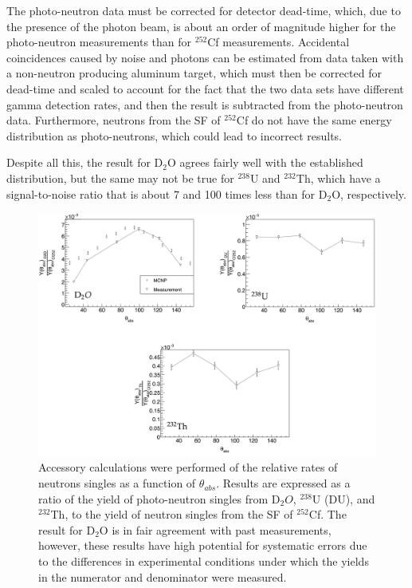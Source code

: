 The photo-neutron data must be corrected for detector dead-time, which, due to the presence of the photon beam, is about an order of magnitude higher for the photo-neutron measurements than for $^{252}$Cf measurements.
Accidental coincidences caused by noise and photons can be estimated from data taken with a non-neutron producing aluminum target, which must then be corrected for dead-time and scaled to account for the fact that the two data sets have different gamma detection rates, and then the result is subtracted from the photo-neutron data.
Furthermore, neutrons from the SF of $^{252}$Cf do not have the same energy distribution as photo-neutrons, which could lead to incorrect results.

Despite all this, the result for D$_{2}$O agrees fairly well with the established distribution, but the same may not be true for $^{238}$U and $^{232}$Th, which have a signal-to-noise ratio that is about 7 and 100 times less than for D$_{2}$O, respectively.

\begin{figure}
    \includegraphics[width = 1\textwidth]{Content/Results/Singles.png}
    \caption{Accessory calculations were performed of the relative rates of neutrons singles as a function of $\theta_{abs}$. 
    Results are expressed as a ratio of the yield of photo-neutron singles from D$_{2}O$, $^{238}$U (DU), and $^{232}$Th, to the yield of neutron singles from the SF of $^{252}$Cf.
   The result for D$_{2}$O is in fair agreement with past measurements, however, these results have high potential for systematic errors due to the differences in experimental conditions under which the yields in the numerator and denominator were measured.
       }
    \label{fig:Singles}
\end{figure}

